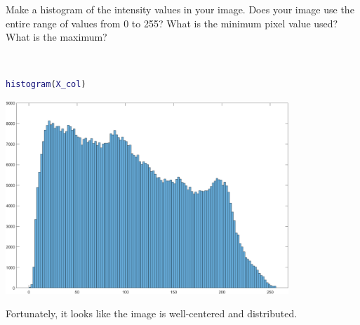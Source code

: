 Make a histogram of the intensity values in your image. Does your image use the entire range of values from 0 to 255? What is the minimum pixel value used? What is the maximum?

\begin{solution}\ 
    \begin{lstlisting}[language=Matlab]
    histogram(X_col)
    \end{lstlisting}

    \begin{center}
        \includegraphics[width=0.8\textwidth]{img/e7p4.png}
    \end{center}
    
    Fortunately, it looks like the image is well-centered and distributed.
\end{solution}